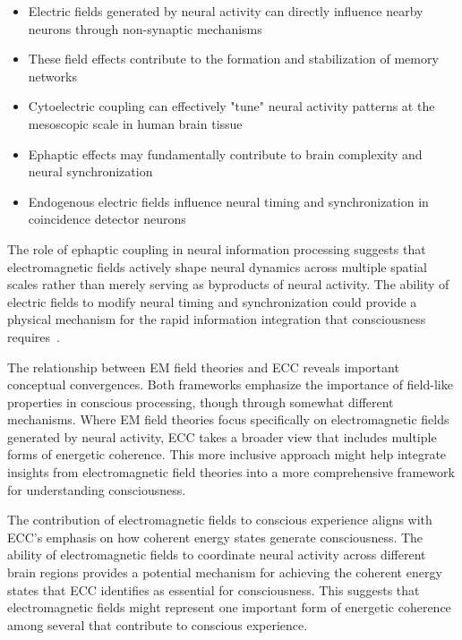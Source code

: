 \begin{itemize}
    \item Electric fields generated by neural activity can directly influence nearby neurons through non-synaptic mechanisms~\cite{Pinotsis2023Ephaptic, anastassiou2015ephaptic}
    \item These field effects contribute to the formation and stabilization of memory networks~\cite{chiang2019slow}
    \item Cytoelectric coupling can effectively "tune" neural activity patterns at the mesoscopic scale in human brain tissue~\cite{Pinotsis2023Cytoelectric, Reimann2020Modeling}
    \item Ephaptic effects may fundamentally contribute to brain complexity and neural synchronization~\cite{Cunha2024Ephapticity, freeman2006nonlinear}
    \item Endogenous electric fields influence neural timing and synchronization in coincidence detector neurons~\cite{Goldwyn2016Neuronal, lee2024cell}
\end{itemize}

The role of ephaptic coupling in neural information processing suggests that electromagnetic fields actively shape neural dynamics across multiple spatial scales rather than merely serving as byproducts of neural activity. The ability of electric fields to modify neural timing and synchronization could provide a physical mechanism for the rapid information integration that consciousness requires~\cite{Goldwyn2016Neuronal, Radman2007}.

The relationship between EM field theories and ECC reveals important conceptual convergences. Both frameworks emphasize the importance of field-like properties in conscious processing, though through somewhat different mechanisms. Where EM field theories focus specifically on electromagnetic fields generated by neural activity, ECC takes a broader view that includes multiple forms of energetic coherence. This more inclusive approach might help integrate insights from electromagnetic field theories into a more comprehensive framework for understanding consciousness.

The contribution of electromagnetic fields to conscious experience aligns with ECC's emphasis on how coherent energy states generate consciousness. The ability of electromagnetic fields to coordinate neural activity across different brain regions provides a potential mechanism for achieving the coherent energy states that ECC identifies as essential for consciousness. This suggests that electromagnetic fields might represent one important form of energetic coherence among several that contribute to conscious experience.

